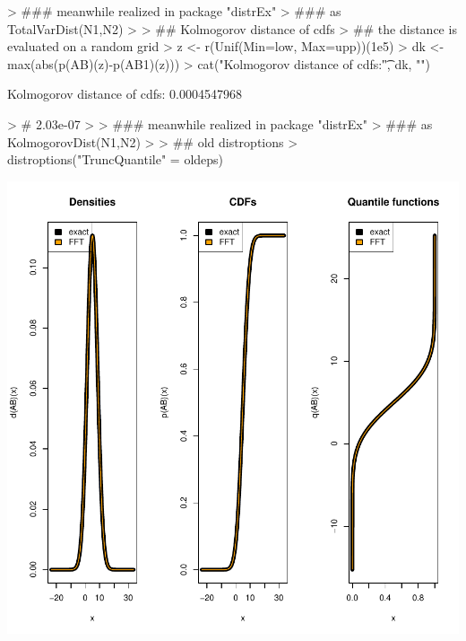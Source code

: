 \documentclass[11pt]{article}
\begin{document}
\begin{Schunk}
\begin{Sinput}
> ### meanwhile realized in package "distrEx"
> ### as TotalVarDist(N1,N2)
>
> ## Kolmogorov distance of cdfs
> ## the distance is evaluated on a random grid
> z <- r(Unif(Min=low, Max=upp))(1e5)
> dk <- max(abs(p(AB)(z)-p(AB1)(z)))
> cat("Kolmogorov distance of cdfs:\t", dk, "\n")
\end{Sinput}
\begin{Soutput}
Kolmogorov distance of cdfs:     0.0004547968
\end{Soutput}
\begin{Sinput}
> # 2.03e-07
>
> ### meanwhile realized in package "distrEx"
> ### as KolmogorovDist(N1,N2)
>
> ## old distroptions
> distroptions("TruncQuantile" = oldeps)
\end{Sinput}
\end{Schunk}
\includegraphics{distr-ConvolutionNormalDistr}
\end{document}

